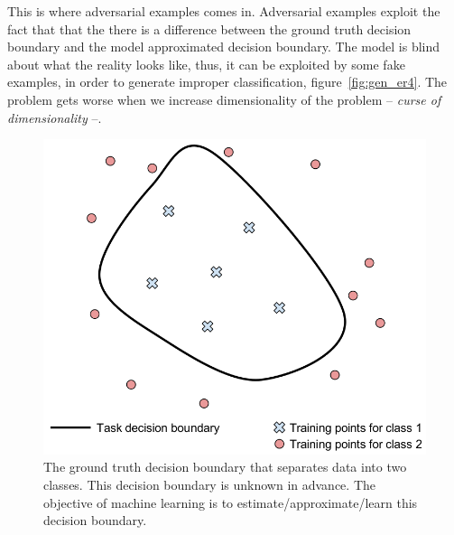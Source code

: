   \par This is where adversarial examples comes in. Adversarial examples exploit the fact that that the there is a difference between the ground truth decision boundary and the model approximated decision boundary. The model is blind about what the reality looks like, thus, it can be exploited by some fake examples, in order to generate improper classification, figure~\ref{fig:gen_er4}. The problem gets worse when we increase dimensionality of the problem -- \textit{curse of dimensionality} --.
  \begin{figure}
    \centering
    \includegraphics[scale=0.3]{images/adv_attack/gen_er1.png}
    \caption{The ground truth decision boundary that separates data into two classes. This decision boundary is unknown in advance. The objective of machine learning is to estimate/approximate/learn this decision boundary.}
    \label{fig:gen_er1}
  \end{figure}

